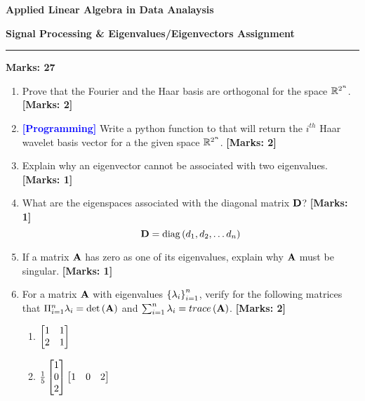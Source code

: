 \documentclass[12pt]{article}
\def\mf{\ensuremath\mathbf}
\def\mb{\ensuremath\mathbb}
\def\lp{\ensuremath\left(}
\def\rp{\ensuremath\right)}
\def\lc{\ensuremath\left\{}
\def\rc{\ensuremath\right\}}
\def\bmx{\ensuremath\begin{bmatrix*}[r]}
\def\emx{\ensuremath\end{bmatrix*}}
\begin{document}
\begin{center}
\begin{large}
\textbf{Applied Linear Algebra in Data Analaysis}\\
\vspace{0.1cm}
\end{large}
\textbf{Signal Processing \& Eigenvalues/Eigenvectors Assignment}
\end{center}
\hrule
\vspace{1em}

\begin{large}
    \textbf{Marks: 27}
\end{large}

\begin{enumerate}
    \item Prove that the Fourier and the Haar basis are orthogonal for the space $\mb{R}^{2^{n}}$.\textbf{[Marks: 2]}
     
    \item \textcolor{blue}{\textbf{[Programming]}} Write a python function to that will return the $i^{th}$ Haar wavelet basis vector for a the given space $\mb{R}^{2^n}$. \textbf{[Marks: 2]}
    
    \item Explain why an eigenvector cannot be associated with two eigenvalues. \textbf{[Marks: 1]}

    \item What are the eigenspaces associated with the diagonal matrix $\mf{D}$? \textbf{[Marks: 1]}
    \[ \mf{D} = \mathrm{diag}\lp d_1, d_2, \ldots d_n\rp \]

    \item If a matrix $\mf{A}$ has zero as one of its eigenvalues, explain why $\mf{A}$ must be singular. \textbf{[Marks: 1]}

    \item For a matrix $\mf{A}$ with eigenvalues $\lc\lambda_i\rc_{i=1}^{n}$, verify for the following matrices that $\Pi_{i=1}^n\lambda_i = \det \lp\mf{A}\rp$ and $\sum_{i=1}^n \lambda_i = trace\lp\mf{A}\rp$. \textbf{[Marks: 2]}
    \begin{enumerate}
        \item $\bmx 1 & 1 \\ 2 & 1\emx$
        \item $\frac{1}{5}\bmx 1 \\ 0 \\ 2 \emx \bmx 1 & 0 & 2\emx$
    \end{enumerate}


\end{enumerate}
\end{document}
